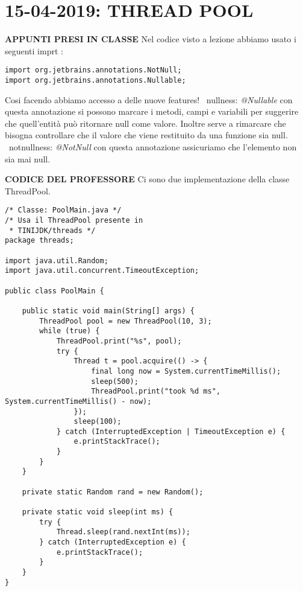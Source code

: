 

\newpage
\section{15-04-2019: THREAD POOL}
\noindent \textbf{APPUNTI PRESI IN CLASSE} \newline
Nel codice visto a lezione abbiamo usato i seguenti imprt :
\begin{lstlisting}[basicstyle=\small,]
import org.jetbrains.annotations.NotNull;
import org.jetbrains.annotations.Nullable;
\end{lstlisting}
Cosi facendo abbiamo accesso a delle nuove features! \newline
\textbullet\ nullness: \textit{@Nullable} con questa annotazione si possono marcare i metodi, campi e variabili per suggerire che quell'entità può ritornare null come valore. Inoltre serve a rimarcare che bisogna controllare che il valore che viene restituito da una funzione sia null. \newline
\textbullet\ notnullness: \textit{@NotNull} con questa annotazione assicuriamo che l'elemento non sia mai null. \newline

\noindent \textbf{CODICE DEL PROFESSORE} \newline
\noindent Ci sono due implementazione della classe ThreadPool. \newline

\begin{lstlisting}[basicstyle=\small,]
/* Classe: PoolMain.java */
/* Usa il ThreadPool presente in
 * TINIJDK/threads */
package threads;

import java.util.Random;
import java.util.concurrent.TimeoutException;

public class PoolMain {

    public static void main(String[] args) {
        ThreadPool pool = new ThreadPool(10, 3);
        while (true) {
            ThreadPool.print("%s", pool);
            try {
                Thread t = pool.acquire(() -> {
                    final long now = System.currentTimeMillis();
                    sleep(500);
                    ThreadPool.print("took %d ms", System.currentTimeMillis() - now);
                });
                sleep(100);
            } catch (InterruptedException | TimeoutException e) {
                e.printStackTrace();
            }
        }
    }

    private static Random rand = new Random();

    private static void sleep(int ms) {
        try {
            Thread.sleep(rand.nextInt(ms));
        } catch (InterruptedException e) {
            e.printStackTrace();
        }
    }
}
\end{lstlisting}



